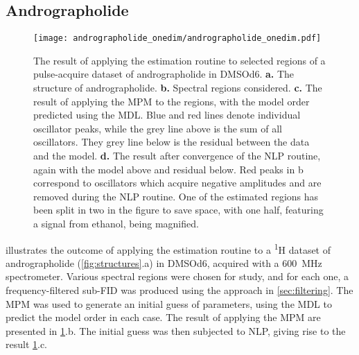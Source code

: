\subsection{Andrographolide}
\label{subsec:andro}
\begin{figure}
    \centering
    \texttt{[image: andrographolide\_onedim/andrographolide\_onedim.pdf]}
    \caption[
        The result of applying the estimation routine to selected regions of a
        pulse-acquire dataset of andrographolide.
    ]{
        The result of applying the estimation routine to selected regions of a
        pulse-acquire dataset of andrographolide in \acs{DMSOd6}.
        \textbf{a.} The structure of andrographolide.
        \textbf{b.} Spectral regions considered.
        \textbf{c.} The result of applying the \acs{MPM} to the regions, with
        the model order predicted using the \acs{MDL}. Blue and red lines denote
        individual oscillator peaks, while the grey line above is the sum of all
        oscillators. They grey line below is the residual between the data and
        the model.
        \textbf{d.} The result after convergence of the \acs{NLP} routine, again
        with the model above and residual below.
        Red peaks in b correspond to oscillators which acquire negative
        amplitudes and are removed during the \acs{NLP} routine.
        One of the estimated regions has been split in two in the
        figure to save space, with one half, featuring a signal from ethanol,
        being magnified.
    }
    \label{fig:andro-onedim}
\end{figure}
 illustrates the outcome of applying the
estimation routine to a \textsuperscript{1}H dataset of
andrographolide (\cref{fig:structures}.a) in \acs{DMSOd6}, acquired with
a \qty{600}{\mega\hertz} spectrometer.
Various spectral regions were chosen for study, and for each one, a
frequency-filtered sub-\ac{FID} was produced using the approach in
\cref{sec:filtering}.
The \ac{MPM} was used to generate an initial guess of parameters, using the
\ac{MDL} to predict the model order in each case. The result of applying the
\ac{MPM} are presented in \cref{fig:andro-onedim}.b. The initial guess
was then subjected to \ac{NLP}, giving rise to the result
\cref{fig:andro-onedim}.c.

